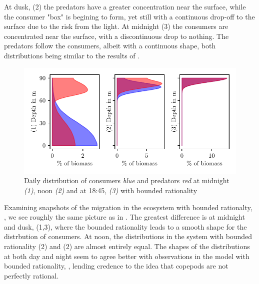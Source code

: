 At dusk, (2) the predators have a greater concentration near the surface, while the consumer "box" is begining to form, yet still with a continuous drop-off to the surface due to the risk from the light.
At midnight (3) the consumers are concentrated near the surface, with a discontinuous drop to nothing. The predators follow the consumers, albeit with a continuous shape, both distributions being similar to the results of \citep{verticalmigration}.
\begin{figure}[H]
\includegraphics{plots/specific_dists_semi_rational.pdf}
\caption{Daily distribution of consumers \emph{blue} and predators \emph{red} at midnight \emph{(1)}, noon \emph{(2)} and at 18:45, \emph{(3)} with bounded rationality}
\label{fig:specific_dists_semi_rational}
\end{figure}

Examining snapshots of the migration in the ecosystem with bounded rationalty, , we see roughly the same picture as in . The greatest difference is at midnight and dusk, (1,3), where the bounded rationality leads to a smooth shape for the distrbution of consumers. At noon, the distributions in the system with bounded rationality (2) and (2) are almost entirely equal. The shapes of the distributions at both day and night seem to agree better with observations in the model with bounded rationality, \citep{visser2001observations, hay1991zooplankton}, lending credence to the idea that copepods are not perfectly rational.

